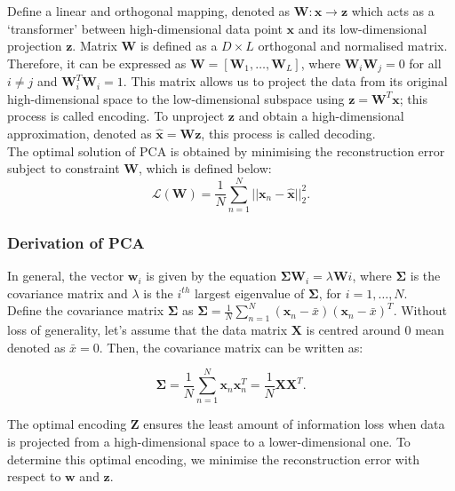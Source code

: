 \documentclass{article}\usepackage[]{graphicx}\usepackage[]{xcolor}
\numberwithin{equation}{section}
\begin{document}
{\noindent
Define a linear and orthogonal mapping, denoted as $\mathbf{W}: \mathbf{x} \to \mathbf{z}$ which acts as a `transformer' between high-dimensional data point $\mathbf{x}$ and its low-dimensional projection $\mathbf{z}$. Matrix $\mathbf{W}$ is defined as a $D \times L$ orthogonal and normalised matrix. Therefore, it can be expressed as $\mathbf{W} = [\mathbf{W}_1, \dots, \mathbf{W}_L]$, where $\mathbf{W}_i \mathbf{W}_j = 0$ for all $i \ne j$ and $\mathbf{W}_i^T \mathbf{W}_i = 1$. This matrix allows us to project the data from its original high-dimensional space to the low-dimensional subspace using $\mathbf{z} = \mathbf{W}^T\mathbf{x}$; this process is called encoding. To unproject $\mathbf{z}$ and obtain a high-dimensional approximation, denoted as $\hat{\mathbf{x}} = \mathbf{W}\mathbf{z}$, this process is called decoding.\\

\noindent
The optimal solution of PCA is obtained by minimising the reconstruction error subject to constraint $\mathbf{W}$, which is defined below:
$$\mathcal{L}(\mathbf{W}) = \frac{1}{N}\sum_{n=1}^{N}||\mathbf{x}_n - \hat{\mathbf{x}}||^2_2.
$$

\subsubsection{Derivation of PCA}

In general, the vector $\mathbf{w}_i$ is given by the equation $\mathbf{\Sigma} \mathbf{W}_i = \lambda \mathbf{W}i$, where $\mathbf{\Sigma}$ is the covariance matrix and $\lambda$ is the $i^{th}$ largest eigenvalue of $\mathbf{\Sigma}$, for $i = 1, \dots, N$.\\

\noindent
Define the covariance matrix $\mathbf{\Sigma}$ as $\mathbf{\Sigma} = \frac{1}{N} \sum_{n=1}^N(\mathbf{x}_n-\bar{x})(\mathbf{x}_n-\bar{x})^T$. Without loss of generality, let's assume that the data matrix $\mathbf{X}$ is centred around $0$ mean denoted as $\bar{x} = 0$. Then, the covariance matrix can be written as:

\begin{equation}
\mathbf{\Sigma} = \frac{1}{N} \sum_{n=1}^N\mathbf{x}_n\mathbf{x}_n^T = \frac{1}{N} \mathbf{X}\mathbf{X}^T.
\end{equation}

\noindent
The optimal encoding $\mathbf{Z}$ ensures the least amount of information loss when data is projected from a high-dimensional space to a lower-dimensional one. To determine this optimal encoding, we minimise the reconstruction error with respect to $\mathbf{w}$ and $\mathbf{z}$.

}
\end{document}
